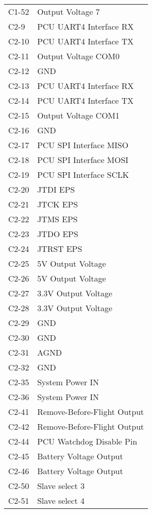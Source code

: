 \begin{appendix}
\begin{longtable}{p{3cm}p{6cm}}
		C1-52 & Output Voltage 7 \\ 
		C2-9 & PCU UART4 Interface RX \\ 
		C2-10 & PCU UART4 Interface TX \\ 
		C2-11 & Output Voltage COM0 \\ 
		C2-12 & GND \\
		C2-13 & PCU UART4 Interface RX \\ 
		C2-14 & PCU UART4 Interface TX \\ 
		C2-15 & Output Voltage COM1 \\ 
		C2-16 & GND \\ 
		C2-17 & PCU SPI Interface MISO \\ 
		C2-18 & PCU SPI Interface MOSI \\ 
		C2-19 & PCU SPI Interface SCLK \\ 
		C2-20 & JTDI EPS \\ 
		C2-21 & JTCK EPS \\ 
		C2-22 & JTMS EPS \\ 
		C2-23 & JTDO EPS \\ 
		
		C2-24 & JTRST EPS \\ 
		C2-25 & 5V Output Voltage \\ 
		C2-26 & 5V Output Voltage \\ 
		C2-27 & 3.3V Output Voltage \\ 
		C2-28 & 3.3V Output Voltage \\ 
		C2-29 & GND \\ 
		C2-30 & GND \\ 
		C2-31 & AGND \\ 
		C2-32 & GND \\ 
		C2-35 & System Power IN \\ 
		C2-36 & System Power IN \\ 
		C2-41 & Remove-Before-Flight Output \\ 
		C2-42 & Remove-Before-Flight Output \\ 
		C2-44 & PCU Watchdog Disable Pin \\ 
		C2-45 & Battery Voltage Output \\ 
		C2-46 & Battery Voltage Output \\
		C2-50 & Slave select 3 \\
		C2-51 & Slave select 4 \\ 
		\bottomrule
		\end{longtable}
		\label{pc104}
		
		
		

\end{appendix}
